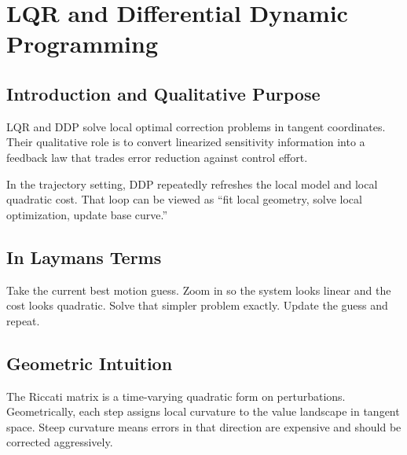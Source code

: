 \documentclass[11pt,letterpaper]{article}
\begin{document}
\section{LQR and Differential Dynamic Programming}

\subsection{Introduction and Qualitative Purpose}
LQR and DDP solve local optimal correction problems in tangent coordinates. Their qualitative role is to convert linearized sensitivity information into a feedback law that trades error reduction against control effort.

In the trajectory setting, DDP repeatedly refreshes the local model and local quadratic cost. That loop can be viewed as ``fit local geometry, solve local optimization, update base curve.''

\subsection{In Laymans Terms}
Take the current best motion guess. Zoom in so the system looks linear and the cost looks quadratic. Solve that simpler problem exactly. Update the guess and repeat.

\subsection{Geometric Intuition}
The Riccati matrix is a time-varying quadratic form on perturbations. Geometrically, each step assigns local curvature to the value landscape in tangent space. Steep curvature means errors in that direction are expensive and should be corrected aggressively.
\end{document}

